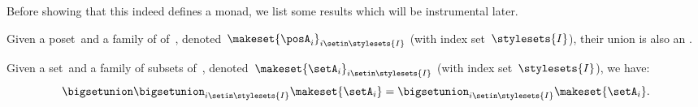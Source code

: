 Before showing that this indeed defines a monad, we list some results which will be instrumental later.
\begin{lemma}
    \label{lem:upperunionupper}
    Given a poset~\posA and a family of  of~\posA, denoted~$\makeset{\posA_i}_{i\setin \stylesets{I}}$ (with index set~$\stylesets{I}$), their union is also an .
\end{lemma}

\begin{lemma}
    \label{lem:setunionset}
    Given a set~\setA and a family of subsets of~\setA, denoted~$\makeset{\setA_i}_{i\setin \stylesets{I}}$ (with index set~$\stylesets{I}$), we have:
    \begin{equation}
        \bigsetunion \bigsetunion_{i\setin \stylesets{I}}\makeset{\setA_i} = \bigsetunion_{i\setin \stylesets{I}}\makeset{\setA_i}.
    \end{equation}
\end{lemma}

